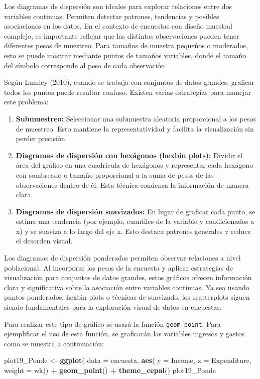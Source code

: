 \documentclass[
  12pt,
]{book}
\newenvironment{Shaded}{\begin{snugshade}}{\end{snugshade}}
\newcommand{\AttributeTok}[1]{\textcolor[rgb]{0.13,0.29,0.53}{#1}}
\newcommand{\FunctionTok}[1]{\textcolor[rgb]{0.13,0.29,0.53}{\textbf{#1}}}
\newcommand{\NormalTok}[1]{#1}
\newcommand{\OtherTok}[1]{\textcolor[rgb]{0.56,0.35,0.01}{#1}}
\newcommand{\SpecialCharTok}[1]{\textcolor[rgb]{0.81,0.36,0.00}{\textbf{#1}}}
\begin{document}
Los diagramas de dispersión son ideales para explorar relaciones entre dos variables continuas. Permiten detectar patrones, tendencias y posibles asociaciones en los datos. En el contexto de encuestas con diseño muestral complejo, es importante reflejar que las distintas observaciones pueden tener diferentes pesos de muestreo. Para tamaños de muestra pequeños o moderados, esto se puede mostrar mediante puntos de tamaños variables, donde el tamaño del símbolo corresponde al peso de cada observación.

Según Lumley (2010), cuando se trabaja con conjuntos de datos grandes, graficar todos los puntos puede resultar confuso. Existen varias estrategias para manejar este problema:

\begin{enumerate}
\def\labelenumi{\arabic{enumi}.}
\item
  \textbf{Submuestreo:} Seleccionar una submuestra aleatoria proporcional a los pesos de muestreo. Esto mantiene la representatividad y facilita la visualización sin perder precisión.
\item
  \textbf{Diagramas de dispersión con hexágonos (hexbin plots):} Dividir el área del gráfico en una cuadrícula de hexágonos y representar cada hexágono con sombreado o tamaño proporcional a la suma de pesos de las observaciones dentro de él. Esta técnica condensa la información de manera clara.
\item
  \textbf{Diagramas de dispersión suavizados:} En lugar de graficar cada punto, se estima una tendencia (por ejemplo, cuantiles de la variable y condicionados a x) y se suaviza a lo largo del eje x. Esto destaca patrones generales y reduce el desorden visual.
\end{enumerate}

Los diagramas de dispersión ponderados permiten observar relaciones a nivel poblacional. Al incorporar los pesos de la encuesta y aplicar estrategias de visualización para conjuntos de datos grandes, estos gráficos ofrecen información clara y significativa sobre la asociación entre variables continuas. Ya sea usando puntos ponderados, hexbin plots o técnicas de suavizado, los scatterplots siguen siendo fundamentales para la exploración visual de datos en encuestas.

Para realizar este tipo de gráfico se usará la función \texttt{geom\_point}. Para ejemplificar el uso de esta función, se graficarán las variables ingresos y gastos como se muestra a continuación:

\begin{Shaded}
\begin{Highlighting}[]
\NormalTok{plot19\_Ponde }\OtherTok{\textless{}{-}} \FunctionTok{ggplot}\NormalTok{( }
  \AttributeTok{data =}\NormalTok{ encuesta,}
      \FunctionTok{aes}\NormalTok{(}
      \AttributeTok{y =}\NormalTok{ Income,}
      \AttributeTok{x =}\NormalTok{ Expenditure,}
      \AttributeTok{weight =}\NormalTok{ wk)) }\SpecialCharTok{+}
  \FunctionTok{geom\_point}\NormalTok{() }\SpecialCharTok{+}
  \FunctionTok{theme\_cepal}\NormalTok{()}
\NormalTok{plot19\_Ponde}
\end{Highlighting}
\end{Shaded}
\end{document}
